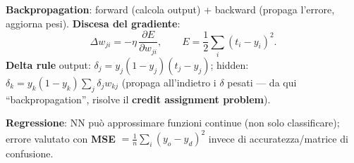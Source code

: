 \documentclass[10pt,a4paper]{article}
\begin{document}
\textbf{Backpropagation}: forward (calcola output) + backward (propaga l'errore, aggiorna pesi). \textbf{Discesa del gradiente}:
\[
\Delta w_{ji} = -\eta\,\frac{\partial E}{\partial w_{ji}}, \qquad E=\frac12\sum_i (t_i-y_i)^2.
\]
\textbf{Delta rule} output: $\delta_j=y_j(1-y_j)(t_j-y_j)$; hidden: $\delta_k=y_k(1-y_k)\sum_{j} \delta_j w_{kj}$ (propaga all'indietro i $\delta$ pesati --- da qui ``backpropagation'', risolve il \textbf{credit assignment problem}).

\textbf{Regressione}: NN può approssimare funzioni continue (non solo classificare); errore valutato con \textbf{MSE} $=\frac{1}{n}\sum_i (y_o-y_d)^2$ invece di accuratezza/matrice di confusione.
\end{document}
